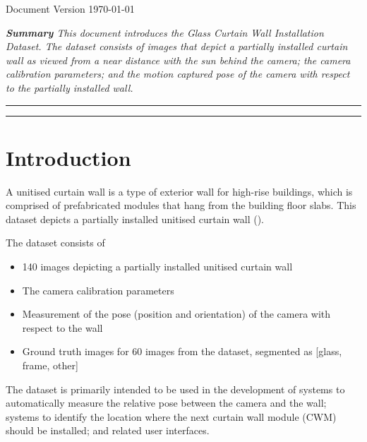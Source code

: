\begin{adjustwidth}{0cm}{0cm}
    \vspace*{-0.5\baselineskip}
    { \footnotesize Document Version \today }
\end{adjustwidth}

\vspace*{-0.8\baselineskip}
\begin{displayquote} \textit{
\textbf{Summary \textemdash}
    This document introduces the Glass Curtain Wall Installation Dataset. The dataset consists of images that depict a partially installed curtain wall as viewed from a near distance with the sun behind the camera; the camera calibration parameters; and the motion captured pose of the camera with respect to the partially installed wall.
} \end{displayquote}
\vspace*{-1\baselineskip}
\rule{\textwidth}{0.4pt}\vspace*{-1\baselineskip}\vspace{3.2pt} %
\rule{\textwidth}{1.6pt}

\section*{Introduction}
A unitised curtain wall is a type of exterior wall for high-rise buildings, which is comprised of prefabricated modules that hang from the building floor slabs. This dataset depicts a partially installed unitised curtain wall ().

The dataset consists of
\begin{itemize}
    \item 140 images depicting a partially installed unitised curtain wall
    \item The camera calibration parameters
    \item Measurement of the pose (position and orientation) of the camera with respect to the wall
    \item Ground truth images for 60 images from the dataset, segmented as [glass, frame, other]
\end{itemize}

The dataset is primarily intended to be used in the development of systems to automatically measure the relative pose between the camera and the wall; systems to identify the location where the next curtain wall module (CWM) should be installed; and related user interfaces.


